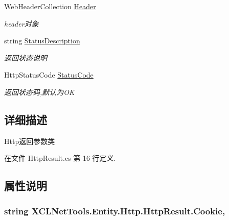 \begin{DoxyCompactItemize}
Web\+Header\+Collection \hyperlink{class_x_c_l_net_tools_1_1_entity_1_1_http_1_1_http_result_af2f67a87b13cf52358900ff814f88f20}{Header}
\begin{DoxyCompactList}\small\item\em header对象 \end{DoxyCompactList}\item 
string \hyperlink{class_x_c_l_net_tools_1_1_entity_1_1_http_1_1_http_result_ae52de9f66b0248b366ee38cc9eae5659}{Status\+Description}
\begin{DoxyCompactList}\small\item\em 返回状态说明 \end{DoxyCompactList}\item 
Http\+Status\+Code \hyperlink{class_x_c_l_net_tools_1_1_entity_1_1_http_1_1_http_result_afa7d6f65074d0dc74bca65f6e7d79a79}{Status\+Code}
\begin{DoxyCompactList}\small\item\em 返回状态码,默认为\+OK \end{DoxyCompactList}\end{DoxyCompactItemize}


\subsection{详细描述}
Http返回参数类 



在文件 Http\+Result.\+cs 第 16 行定义.



\subsection{属性说明}
\subsubsection[{\texorpdfstring{Cookie}{Cookie}}]{\setlength{\rightskip}{0pt plus 5cm}string X\+C\+L\+Net\+Tools.\+Entity.\+Http.\+Http\+Result.\+Cookie\hspace{0.3cm}{\ttfamily [get]}, {\ttfamily [set]}}\hypertarget{class_x_c_l_net_tools_1_1_entity_1_1_http_1_1_http_result_a08219bb78cf5eb91045b344c91e72fad}{}\label{class_x_c_l_net_tools_1_1_entity_1_1_http_1_1_http_result_a08219bb78cf5eb91045b344c91e72fad}


